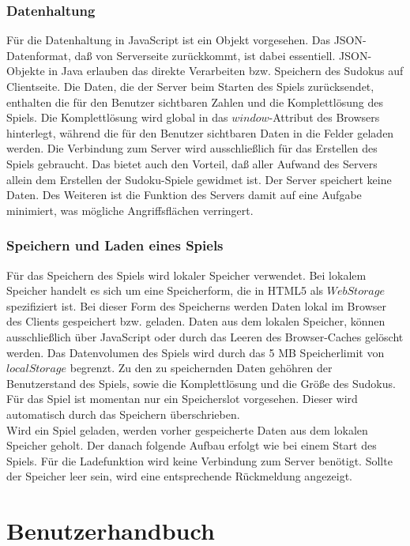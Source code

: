 \documentclass[a4paper,12pt]{scrreprt}
\begin{document}
	\subsection{Datenhaltung}
	F\"ur die Datenhaltung in JavaScript ist ein Objekt vorgesehen. Das JSON-Datenformat, da{\ss} von
	Serverseite zur\"uckkommt, ist dabei essentiell. JSON-Objekte in Java erlauben das direkte
	Verarbeiten bzw. Speichern des Sudokus auf Clientseite. Die Daten, die der Server beim Starten des
	Spiels zur\"ucksendet, enthalten die f\"ur den Benutzer sichtbaren Zahlen und die Komplettl\"osung
	des Spiels. Die Komplettl\"osung wird global in das $window$-Attribut des Browsers hinterlegt,
	w\"ahrend die f\"ur den Benutzer sichtbaren Daten in die Felder geladen werden. Die Verbindung
	zum Server wird ausschließlich f\"ur das Erstellen des Spiels gebraucht. Das bietet auch den Vorteil,
	da{\ss} aller Aufwand des Servers allein dem Erstellen der Sudoku-Spiele gewidmet ist. Der Server
	speichert keine Daten. Des Weiteren ist die Funktion des Servers damit auf eine Aufgabe minimiert,
	was m\"ogliche Angriffsflächen verringert.

	\subsection{Speichern und Laden eines Spiels}
	F\"ur das Speichern des Spiels wird lokaler Speicher verwendet. Bei lokalem Speicher handelt es
	sich um eine Speicherform, die in HTML5 als $Web Storage$ spezifiziert ist. Bei dieser Form des
	Speicherns werden Daten lokal im Browser des Clients gespeichert bzw. geladen. Daten aus dem
	lokalen Speicher, k\"onnen ausschlie{\ss}lich \"uber JavaScript oder durch das Leeren des
	Browser-Caches gel\"oscht werden. Das Datenvolumen des Spiels wird durch das 5 MB Speicherlimit
	von $localStorage$ begrenzt. Zu den zu speichernden Daten geh\"ohren der Benutzerstand des Spiels,
	sowie die Komplettl\"osung und die Gr\"o{\ss}e des Sudokus. F\"ur das Spiel ist momentan nur ein
	Speicherslot vorgesehen. Dieser wird automatisch durch das Speichern \"uberschrieben.\medskip \\
	Wird ein Spiel geladen, werden vorher gespeicherte Daten aus dem lokalen Speicher geholt. Der danach
	folgende Aufbau erfolgt wie bei einem Start des Spiels. F\"ur die Ladefunktion wird keine Verbindung
	zum Server ben\"otigt. Sollte der Speicher leer sein, wird eine entsprechende R\"uckmeldung angezeigt.

	\chapter{Benutzerhandbuch}
\end{document}
